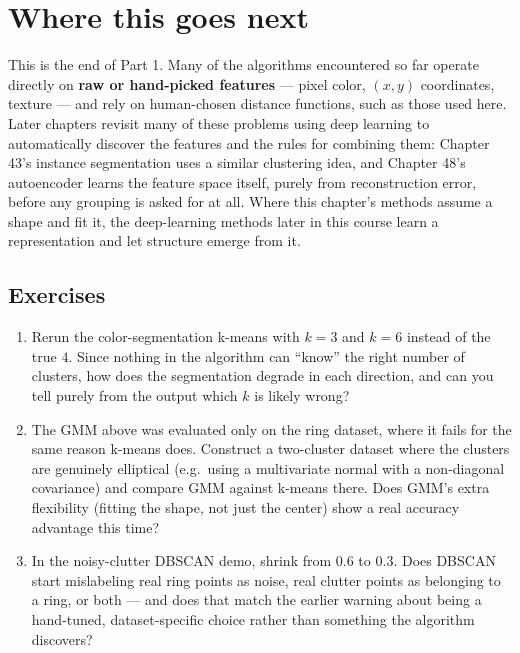 \section{Where this goes next}

This is the end of Part 1. Many of the algorithms encountered so far operate directly on \textbf{raw or hand-picked features} --- pixel color, $(x,y)$ coordinates, texture --- and rely on human-chosen distance functions, such as those used here. Later chapters revisit many of these problems using deep learning to automatically discover the features and the rules for combining them: Chapter 43's instance segmentation uses a similar clustering idea, and Chapter 48's autoencoder learns the feature space itself, purely from reconstruction error, before any grouping is asked for at all. Where this chapter's methods assume a shape and fit it, the deep-learning methods later in this course learn a representation and let structure emerge from it.

\subsection*{Exercises}
\begin{enumerate}
  \item Rerun the color-segmentation k-means with $k=3$ and $k=6$ instead of the true $4$. Since nothing in the algorithm can ``know'' the right number of clusters, how does the segmentation degrade in each direction, and can you tell purely from the output which $k$ is likely wrong?
  \item The GMM above was evaluated only on the ring dataset, where it fails for the same reason k-means does. Construct a two-cluster dataset where the clusters are genuinely elliptical (e.g.\ using a multivariate normal with a non-diagonal covariance) and compare GMM against k-means there. Does GMM's extra flexibility (fitting the shape, not just the center) show a real accuracy advantage this time?
  \item In the noisy-clutter DBSCAN demo, shrink  from $0.6$ to $0.3$. Does DBSCAN start mislabeling real ring points as noise, real clutter points as belonging to a ring, or both --- and does that match the earlier warning about  being a hand-tuned, dataset-specific choice rather than something the algorithm discovers?
\end{enumerate}

\vfill
{}
